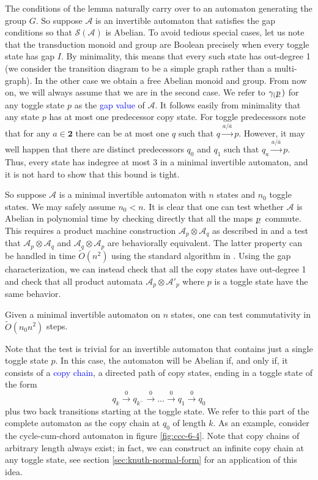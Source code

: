 \documentclass[12pt]{svmult}
\def\emph#1{\textcolor{blue}{#1}}
\def\2{\mathbf{2}}
\def\F#1{\underline{\smash{#1}}\,}       %
\def\cA{\mathcal{A}}
\def\gap#1{\gamma_{#1}}         %
\def\oa{\overline{a}}
\def\pre#1{{#1}^{-}}
\def\sO{\widetilde{\mathit{O}}}
\def\sgr{\mathcal{S}}                %
\def\trans#1#2#3{{#1}\stackrel{{#2}}{\longrightarrow}{#3}}
\begin{document}
The conditions of the lemma naturally carry over to an automaton generating 
the group $G$. 
So suppose $\cA$ is an invertible automaton that satisfies the gap conditions
so that $\sgr(\cA)$ is Abelian. 
To avoid tedious special cases, let us note that the transduction monoid 
and group are Boolean precisely when every toggle state has gap $I$. 
By minimality, this means that every such state has out-degree 1 
(we consider the transition diagram to be a simple graph rather than a 
multi-graph). 
In the other case we obtain a free Abelian monoid and group. 
From now on, we will always assume that we are in the second case.
We refer to $\gap(\F{p})$ for any toggle state $p$ as the \emph{gap value} of $\cA$. 
It follows easily from minimality that any state $p$ has at most one 
predecessor copy state.  For toggle predecessors note that for any $a \in \2$ 
there can be at most one $q$  such that 
$\trans{q}{a/\oa}{p}$. 
However, it may well happen that there are distinct predecessors 
$q_{0}$ and $q_{1}$ such that $\trans{q_{a}}{a/\oa}{p}$. 
Thus, every state 
has indegree at most 3 in a minimal invertible 
automaton, and it is not hard to show that this bound is tight. 


So suppose $\cA$ is a minimal invertible automaton with $n$ states and 
$n_{0}$ toggle states.  We may safely assume $n_{0} < n$. 
It is clear that one can test whether $\cA$ is Abelian in polynomial time 
by checking directly that all the maps  $\F{p}$ commute. 
This requires a product machine construction $\cA_{p} \otimes \cA_{q}$
as described in \cite{ElgotMezei65:relations_fa}
and a test that $\cA_{p} \otimes \cA_{q}$ and $\cA_{q} \otimes \cA_{p}$ 
are behaviorally equivalent. 
The latter property can be handled in time $\sO(n^2)$ using the standard 
algorithm in \cite{HopcroftUllman}.
Using the gap characterization, we can instead check that all the copy states 
have out-degree 1 and check that all   
product automata $\cA_{p} \otimes \cA'_{p}$ where $p$ is a toggle state have the same 
behavior. 

\begin{lemma}
Given a minimal invertible automaton on $n$ states, one can test 
commutativity in $\sO(n_{0}n^{2})$ steps. 
\end{lemma}

Note that the test is trivial for an invertible automaton that 
contains just a single toggle state $p$.
In this case, the automaton will be Abelian if, and only if, it 
consists of a \emph{copy chain}, a directed path of copy states, ending in a toggle state 
of the form 
%
$$
    q_{k} \stackrel{0}{\longrightarrow} q_{\pre{k}} \stackrel{0}{\longrightarrow} \ldots %
    \stackrel{0}{\longrightarrow} q_{1} \stackrel{0}{\longrightarrow} q_{0}
$$
%
plus two back transitions starting at the toggle state. 
We refer to this part of the complete automaton as the copy chain at $q_0$ of length $k$. 
As an example, consider the cycle-cum-chord automaton in figure \ref{fig:ccc-6-4}.
Note that copy chains of arbitrary length always exist; in fact, we can construct an
infinite copy chain at any toggle state, see section \ref{sec:knuth-normal-form} for an 
application of this idea. 
\end{document}
